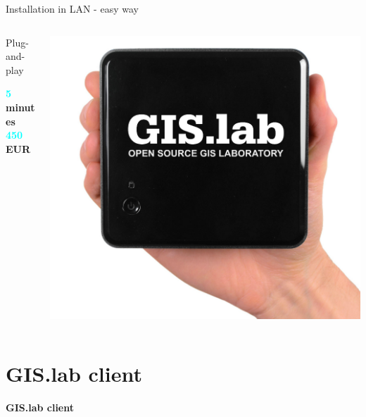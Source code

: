\documentclass[12pt]{beamer}
\begin{document}
\begin{frame}{Installation in LAN - easy way}
	\begin{minipage}[\textheight]{\textwidth}
	\begin{columns}[T]
		\begin{column}{0.5\textwidth}
			\vspace{0.2\textheight}
			Plug-and-play
			\begin{flushleft}
				\textbf{\textcolor{Cyan}{5} minutes} \\
				\textbf{\textcolor{Cyan}{450} EUR} \\
			\end{flushleft}
		\end{column}
		\begin{column}{0.5\textwidth}
			\includegraphics[keepaspectratio=true,width=\textwidth]{images/gislab-unit.png}
		\end{column}
	\end{columns}
	\end{minipage}
\end{frame}


\section{GIS.lab client}
\begin{frame}
	\begin{center}
		\LARGE\textbf{GIS.lab client}
	\end{center}
\end{frame}
\end{document}
